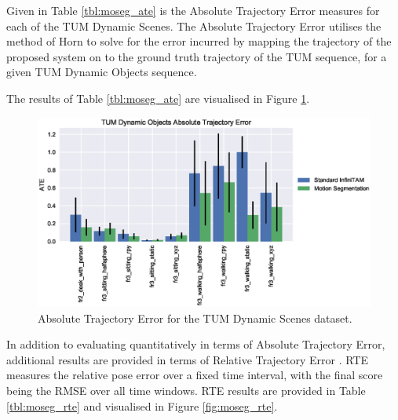 Given in Table \ref{tbl:moseg_ate} is the Absolute Trajectory Error measures
for each of the TUM Dynamic Scenes. The Absolute Trajectory Error utilises the
method of Horn \cite{Horn1987} to solve for the error incurred by mapping the
trajectory of the proposed system on to the ground truth trajectory of the TUM
sequence, for a given TUM Dynamic Objects sequence.

The results of Table \ref{tbl:moseg_ate} are visualised in Figure
\ref{fig:moseg_ate}.

\begin{figure}[ht]
  \label{fig:moseg_ate}
  \centering
  \includegraphics[width=\linewidth]{figures/moseg/ate.eps}
  \caption{Absolute Trajectory Error for the TUM Dynamic Scenes dataset.}
\end{figure}

In addition to evaluating quantitatively in terms of Absolute Trajectory Error,
additional results are provided in terms of Relative Trajectory Error
\cite{Sturm2012}. RTE measures the relative pose error over a fixed time
interval, with the final score being the RMSE over all time windows. RTE results
are provided in Table \ref{tbl:moseg_rte} and visualised in Figure
\ref{fig:moseg_rte}.

